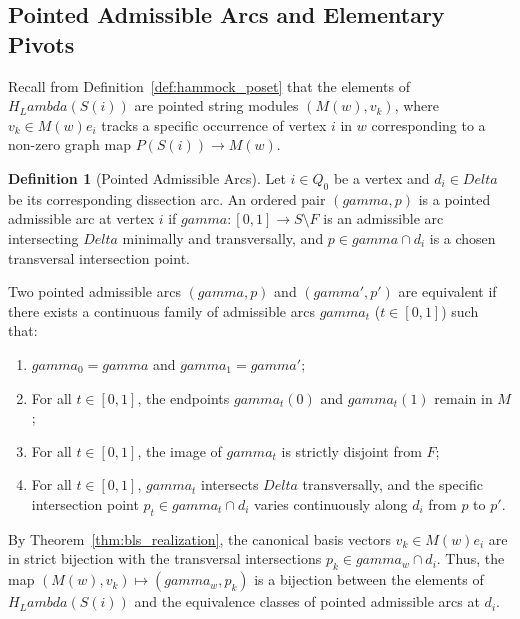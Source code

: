 \documentclass[11pt,a4paper,reqno]{amsart}
\def\mathcal#1{#1}%
\def\forb{F}%
\def\gamma{gamma}%
\def\Delta{Delta}%
\def\Lambda{Lambda}%
\def\emph#1{#1}%
\theoremstyle{definition}
\newtheorem{definition}[theorem]{Definition}
\theoremstyle{remark}
\newcommand{\forb}{\mathfrak{F}}
\begin{document}
\subsection{Pointed Admissible Arcs and Elementary Pivots}
\label{subsec:pointed_arcs}

Recall from Definition~\ref{def:hammock_poset} that the elements of $H_\Lambda(S(i))$ are pointed string modules $(M(w), v_k)$, where $v_k \in M(w)e_i$ tracks a specific occurrence of vertex $i$ in $w$ corresponding to a non-zero graph map $P(S(i)) \to M(w)$.

\begin{definition}[Pointed Admissible Arcs]
\label{def:pointed_arcs}
Let $i \in Q_0$ be a vertex and $d_i \in \Delta$ be its corresponding dissection arc. An ordered pair $(\gamma, p)$ is a \emph{pointed admissible arc} at vertex $i$ if $\gamma \colon [0,1] \to \mathcal{S} \setminus \forb$ is an admissible arc intersecting $\Delta$ minimally and transversally, and $p \in \gamma \cap d_i$ is a chosen transversal intersection point. 

Two pointed admissible arcs $(\gamma, p)$ and $(\gamma', p')$ are equivalent if there exists a continuous family of admissible arcs $\gamma_t$ ($t \in [0,1]$) such that:
\begin{enumerate}
    \item $\gamma_0 = \gamma$ and $\gamma_1 = \gamma'$;
    \item For all $t \in [0,1]$, the endpoints $\gamma_t(0)$ and $\gamma_t(1)$ remain in $\mathcal{M}$;
    \item For all $t \in [0,1]$, the image of $\gamma_t$ is strictly disjoint from $\forb$;
    \item For all $t \in [0,1]$, $\gamma_t$ intersects $\Delta$ transversally, and the specific intersection point $p_t \in \gamma_t \cap d_i$ varies continuously along $d_i$ from $p$ to $p'$.
\end{enumerate}
\end{definition}

By Theorem~\ref{thm:bls_realization}, the canonical basis vectors $v_k \in M(w)e_i$ are in strict bijection with the transversal intersections $p_k \in \gamma_w \cap d_i$. Thus, the map $(M(w), v_k) \mapsto (\gamma_w, p_k)$ is a bijection between the elements of $H_\Lambda(S(i))$ and the equivalence classes of pointed admissible arcs at $d_i$.
\end{document}
